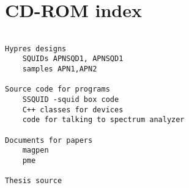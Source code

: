%
%

\chapter{CD-ROM index}


\begin{verbatim}

Hypres designs
	SQUIDs APNSQD1, APNSQD1	
	samples APN1,APN2

Source code for programs
	SSQUID -squid box code
	C++ classes for devices
	code for talking to spectrum analyzer

Documents for papers
	magpen
	pme

Thesis source

\end{verbatim}
